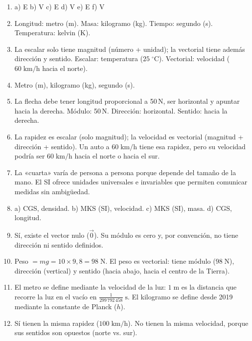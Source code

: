 \documentclass[12pt, a4paper]{article}
\begin{document}
\begin{enumerate}[leftmargin=*, label=\textbf{\arabic*.}]
  \item a) E \quad b) V \quad c) E \quad d) V \quad e) E \quad f) V

  \item Longitud: metro (m). Masa: kilogramo (kg). Tiempo: segundo (s). Temperatura: kelvin (K).

  \item La escalar solo tiene magnitud (número + unidad); la vectorial tiene además dirección y sentido. Escalar: temperatura ($25\;^\circ\text{C}$). Vectorial: velocidad ($60\;\text{km/h}$ hacia el norte).

  \item Metro (m), kilogramo (kg), segundo (s).

  \item La flecha debe tener longitud proporcional a 50\,N, ser horizontal y apuntar hacia la derecha. Módulo: 50\,N. Dirección: horizontal. Sentido: hacia la derecha.

  \item La rapidez es escalar (solo magnitud); la velocidad es vectorial (magnitud + dirección + sentido). Un auto a $60\;\text{km/h}$ tiene esa rapidez, pero su velocidad podría ser $60\;\text{km/h}$ hacia el norte o hacia el sur.

  \item La «cuarta» varía de persona a persona porque depende del tamaño de la mano. El SI ofrece unidades universales e invariables que permiten comunicar medidas sin ambigüedad.

  \item a) CGS, densidad. b) MKS (SI), velocidad. c) MKS (SI), masa. d) CGS, longitud.

  \item Sí, existe el vector nulo ($\vec{0}$). Su módulo es cero y, por convención, no tiene dirección ni sentido definidos.

  \item Peso $= mg = 10 \times 9{,}8 = 98\;\text{N}$. El peso es vectorial: tiene módulo ($98\;\text{N}$), dirección (vertical) y sentido (hacia abajo, hacia el centro de la Tierra).

  \item El metro se define mediante la velocidad de la luz: $1\;\text{m}$ es la distancia que recorre la luz en el vacío en $\frac{1}{299\,792\,458}\;\text{s}$. El kilogramo se define desde 2019 mediante la constante de Planck ($h$).

  \item Sí tienen la misma rapidez ($100\;\text{km/h}$). No tienen la misma velocidad, porque sus sentidos son opuestos (norte vs. sur).
\end{enumerate}
\end{document}
